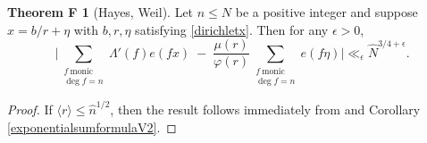 \documentclass{article}
\theoremstyle{definition}
\newtheorem*{thmF}{Theorem F}
\theoremstyle{definition}
\theoremstyle{remark}
\renewcommand\phi\varphi
\newcommand{\1}{\mathbf{1}}
\numberwithin{equation}{section}
\begin{document}
\begin{thmF}[Hayes, Weil]\label{Hayes}
Let $n\leq N$ be a positive integer and suppose $x=b\slash r +\eta$ with $b,r,\eta$ satisfying \eqref{dirichletx}. Then for any $\epsilon>0$, 
\[\Bigg|\sum_{\substack{f~\text{monic}\\\deg f=n}}\Lambda'(f)e(fx)\;-\;\frac{\mu(r)}{\phi(r)}\sum_{\substack{f~\text{monic}\\ \deg f=n}}e(f\eta)\Bigg|\ll_\epsilon \widehat{N}^{3\slash 4+\epsilon}.\]
\end{thmF}
\begin{proof}
If $\langle r \rangle \leq \widehat{n}^{1/2}$, then the result follows immediately from \cite[Lemma 5]{Pollack13} and Corollary \ref{exponentialsumformulaV2}. 


\end{proof}
\end{document}
